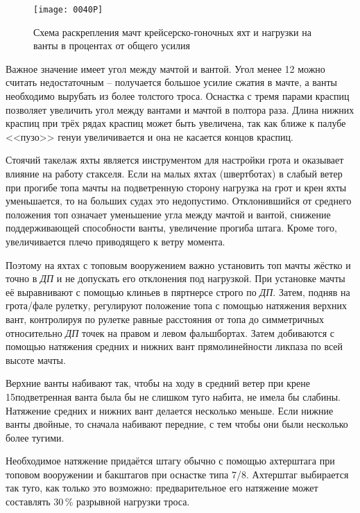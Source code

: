 \begin{wrapfigure}{O}{0.5\textwidth}
  \centering{}
  \texttt{[image: 0040P]}
  \caption{Схема раскрепления мачт крейсерско-гоночных яхт и нагрузки на ванты в процентах от общего усилия}
  \label{fig:40}
\end{wrapfigure}

Важное значение имеет угол между мачтой и вантой. Угол менее 12\gr
можно считать недостаточным \--- получается большое усилие сжатия в
мачте, а ванты необходимо вырубать из более толстого троса. Оснастка с
тремя парами краспиц позволяет увеличить угол между вантами и мачтой в
полтора раза. Длина нижних краспиц при трёх рядах краспиц может быть
увеличена, так как ближе к палубе <<пузо>> генуи увеличивается и она
не касается концов краспиц.

Стоячий такелаж яхты является инструментом для настройки грота и
оказывает влияние на работу стакселя. Если на малых яхтах (швертботах)
в слабый ветер при прогибе топа мачты на подветренную сторону нагрузка
на грот и крен яхты уменьшается, то на больших судах это
недопустимо. Отклонившийся от среднего положения топ означает
уменьшение угла между мачтой и вантой, снижение поддерживающей
способности ванты, увеличение прогиба штага. Кроме того, увеличивается
плечо приводящего к ветру момента.

Поэтому на яхтах с топовым вооружением важно установить топ мачты
жёстко и точно в \textit{ДП} и не допускать его отклонения под
нагрузкой. При установке мачты её выравнивают с помощью клиньев в
пяртнерсе строго по \textit{ДП}. Затем, подняв на грота\-/фале
рулетку, регулируют положение топа с помощью натяжения верхних вант,
контролируя по рулетке равные расстояния от топа до симметричных
относительно \textit{ДП} точек на правом и левом фальшбортах. Затем
добиваются с помощью натяжения средних и нижних вант прямолинейности
ликпаза по всей высоте мачты.

Верхние ванты набивают так, чтобы на ходу в средний ветер при крене
15\gr подветренная ванта была бы не слишком туго набита, не
имела бы слабины. Натяжение средних и нижних вант делается несколько
меньше. Если нижние ванты двойные, то сначала набивают передние, с тем
чтобы они были несколько более тугими.

Необходимое натяжение придаётся штагу обычно с помощью ахтерштага при
топовом вооружении и бакштагов при оснастке типа 7/8. Ахтерштаг
выбирается так туго, как только это возможно: предварительное его
натяжение может составлять 30\,\% разрывной нагрузки троса.

